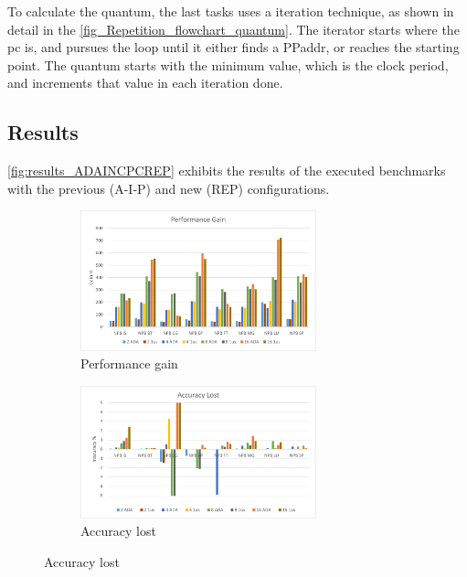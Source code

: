 To calculate the quantum, the last tasks uses a iteration technique, as shown in detail in the \autoref{fig_Repetition_flowchart_quantum}. The iterator starts where the \gls{pc} is, and pursues the loop until it either finds a PPaddr, or reaches the starting point. The quantum starts with the minimum value, which is the clock period, and increments that value in each iteration done. 

\subsection{Results}

\autoref{fig:results_ADAINCPCREP} exhibits the results of the executed benchmarks with the previous (A-I-P) and new (REP) configurations. 

\begin{figure}[H]
\centering
\begin{subfigure}{\textwidth}
    \centering
    \includegraphics[width=0.75\textwidth]{Images/Performance_ADA.png}
    \caption{ Performance gain}
    \label{fig:Performance_ADAINCPCREP}
\end{subfigure}
\begin{subfigure}{\textwidth}
    \centering
    \includegraphics[width=0.75\textwidth]{Images/Accuracy_ADA.png}
    \caption{ Accuracy lost}
    \label{fig:Accuracy_ADAINCPCREP}
\end{subfigure}

\end{figure}
